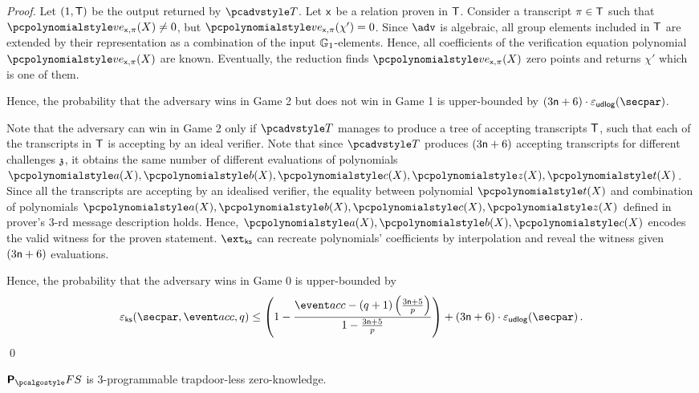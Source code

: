 \begin{proof}
	Let $(1, \mathsf{T})$ be the output returned by $\tdv$. Let $\mathsf{x}$ be a relation proven in $\mathsf{T}$.  Consider a transcript $\pi \in \mathsf{T}$ such that $\vereq_{\inp, \zkproof}(X) \neq 0$, but $\vereq_{\inp, \zkproof}(\chi') = 0$. Since $\adv$ is algebraic, all group elements included in $\mathsf{T}$ are extended by their representation as a combination of the input $\mathbb{G}_1$-elements. Hence, all coefficients of the verification equation polynomial $\vereq_{\inp, \zkproof}(X)$ are known. 
	Eventually, the reduction finds $\vereq_{\inp, \zkproof}(X)$ zero points and returns $\chi'$ which is one of them.
	
	Hence, the probability that the adversary wins in Game 2 but does not win in Game 1 is upper-bounded by $(3 \noofc + 6) \cdot \epsudlog (\secpar)$.
	
	
	Note that the adversary can win in Game 2 only if $\tdv$ manages to produce a tree of accepting transcripts $\mathsf{T}$, such that each of the transcripts in $\mathsf{T}$ is accepting by an ideal verifier. Note that since $\tdv$ produces $(3 \mathsf{n} + 6)$ accepting transcripts for different challenges $\mathfrak{z}$, it obtains the same number of different evaluations of polynomials $\p{a} (X), \p{b} (X), \p{c} (X), \p{z} (X), \p{t} (X)$. Since all the transcripts are accepting by an idealised verifier, the equality between polynomial $\p{t} (X)$ and combination of polynomials $\p{a} (X), \p{b} (X), \p{c} (X), \p{z} (X)$ defined in prover's $3$-rd message description holds. Hence, $\p{a} (X), \p{b} (X), \p{c} (X)$ encodes the valid witness for the proven statement. $\extcss$ can recreate polynomials' coefficients by interpolation and reveal the witness given $(3 \mathsf{n} + 6)$ evaluations. 
	
	
	Hence, the probability that the adversary wins in Game 0 is upper-bounded by 
	\[
	\epscss(\secpar,\accProb, q) \leq \left(1 - \frac{\accProb - (q + 1) \left(\frac{3 \noofc + 5}{p} \right)}{1 - \frac{3 \noofc + 5}{p}}\right) + (3 \noofc + 6) \cdot \epsudlog (\secpar)\,. 
	\]
	\qed
\end{proof}


\begin{lemma}
	\label{lem:plonk_tlzk}
	$\plonkprotfs$ is 3-programmable trapdoor-less zero-knowledge.
\end{lemma}

